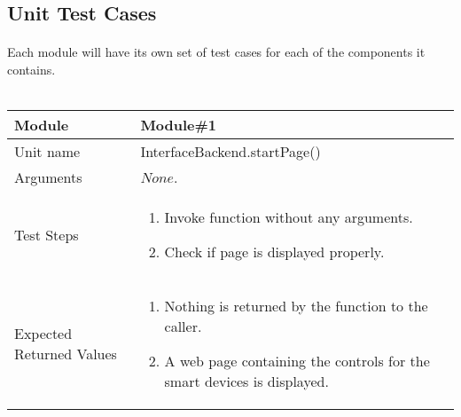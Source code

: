 \subsection{Unit Test Cases}
\paragraph{}
Each module will have its own set of test cases for each of the components it contains.\\\\
%
%
\begin{tabular}{|p{4cm}|p{9cm}|}
\hline
Module & Module\#1 \\
\hline
Unit name & InterfaceBackend.startPage() \\
\hline
Arguments & $None$. \\
\hline
\vspace*{\baselineskip}Test Steps & \begin{enumerate}
\item Invoke function without any arguments.
\item Check if page is displayed properly.
\end{enumerate}\\
\hline
\vspace*{\baselineskip}Expected Returned Values & \begin{enumerate}
\item Nothing is returned by the function to the caller.
\item A web page containing the controls for the smart devices is displayed.
\end{enumerate} \\
\hline
\end{tabular}
\\[2\baselineskip]
%
